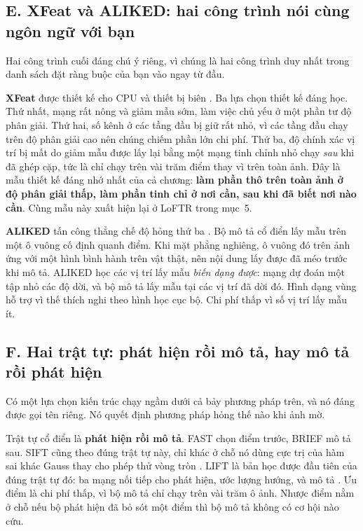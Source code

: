 \documentclass[../../deep_learning.tex]{subfiles}
\begin{document}
\subsection{E. XFeat và ALIKED: hai công trình nói cùng ngôn ngữ với bạn}
Hai công trình cuối đáng chú ý riêng, vì chúng là hai công trình duy nhất trong danh sách đặt ràng buộc của bạn vào ngay từ đầu.

\textbf{XFeat} được thiết kế cho CPU và thiết bị biên \cite{potje2024xfeat}. Ba lựa chọn thiết kế đáng học. Thứ nhất, mạng rất nông và giảm mẫu sớm, làm việc chủ yếu ở một phần tư độ phân giải. Thứ hai, số kênh ở các tầng đầu bị giữ rất nhỏ, vì các tầng đầu chạy trên độ phân giải cao nên chúng chiếm phần lớn chi phí. Thứ ba, độ chính xác vị trí bị mất do giảm mẫu được lấy lại bằng một mạng tinh chỉnh nhỏ chạy \emph{sau} khi đã ghép cặp, tức là chỉ chạy trên vài trăm điểm thay vì trên toàn ảnh. Đây là mẫu thiết kế đáng nhớ nhất của cả chương: \textbf{làm phần thô trên toàn ảnh ở độ phân giải thấp, làm phần tinh chỉ ở nơi cần, sau khi đã biết nơi nào cần}. Cùng mẫu này xuất hiện lại ở LoFTR trong mục~5.

\textbf{ALIKED} tấn công thẳng chế độ hỏng thứ ba \cite{zhao2023aliked}. Bộ mô tả cổ điển lấy mẫu trên một ô vuông cố định quanh điểm. Khi mặt phẳng nghiêng, ô vuông đó trên ảnh ứng với một hình bình hành trên vật thật, nên nội dung lấy được đã méo trước khi mô tả. ALIKED học các vị trí lấy mẫu \emph{biến dạng được}: mạng dự đoán một tập nhỏ các độ dời, và bộ mô tả lấy mẫu tại các vị trí đã dời đó. Hình dạng vùng hỗ trợ vì thế thích nghi theo hình học cục bộ. Chi phí thấp vì số vị trí lấy mẫu ít.

\subsection{F. Hai trật tự: phát hiện rồi mô tả, hay mô tả rồi phát hiện}
Có một lựa chọn kiến trúc chạy ngầm dưới cả bảy phương pháp trên, và nó đáng được gọi tên riêng. Nó quyết định phương pháp hỏng thế nào khi ảnh mờ.

Trật tự cổ điển là \textbf{phát hiện rồi mô tả}. FAST chọn điểm trước, BRIEF mô tả sau. SIFT cũng theo đúng trật tự này, chỉ khác ở chỗ nó dùng cực trị của hàm sai khác Gauss thay cho phép thử vòng tròn \cite{lowe2004sift}. LIFT là bản học được đầu tiên của đúng trật tự đó: ba mạng nối tiếp cho phát hiện, ước lượng hướng, và mô tả \cite{yi2016lift}. Ưu điểm là chi phí thấp, vì bộ mô tả chỉ chạy trên vài trăm ô ảnh. Nhược điểm nằm ở chỗ nếu bộ phát hiện đã bỏ sót một điểm thì bộ mô tả không có cơ hội nào cứu.
\end{document}
